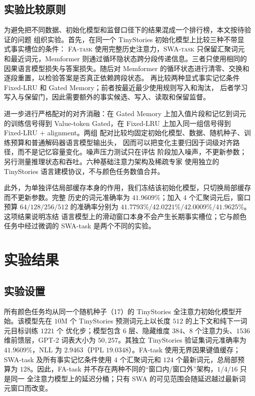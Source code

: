 \documentclass[letterpaper]{article}
\begin{document}
\subsection{实验比较原则}

为避免把不同数据、初始化模型和监督口径下的结果混成一个排行榜，本文按待验证的问题
组织实验。首先，在同一个 TinyStories 初始化模型上比较三种不带显式事实槽位的条件：
\textsc{FA-task} 使用完整历史注意力，\textsc{SWA-task} 只保留汇聚词元和最近词元，Memformer
则通过循环隐状态跨分段传递信息。三者只使用相同的因果语言模型损失与答案损失。随后对
Memformer 的循环状态进行清零、交换和逐段重置，以检验答案是否真正依赖跨段状态。
再比较两种显式事实记忆条件 Fixed-LRU 和 Gated Memory；前者按最近最少使用规则写入和淘汰，
后者学习写入与保留门，因此需要额外的事实候选、写入、读取和保留监督。

进一步进行严格配对的对齐消融：在 Gated Memory 上加入值片段和记忆到词元的训练信号得到
Value-token Gated，在 Fixed-LRU 上加入同一组信号得到 Fixed-LRU + alignment。两组
配对比较均固定初始化模型、数据、随机种子、训练预算和普通解码器语言模型输出头，
因而可以把变化主要归因于词级对齐路径，而不是记忆容量变化。噪声压力测试只在评估
阶段加入噪声，不更新参数；另行测量推理状态和吞吐。六种基础注意力架构及稀疏专家
使用独立的 TinyStories 语言建模协议，不与颜色任务数值合并。

此外，为单独评估局部缓存本身的作用，我们冻结该初始化模型，只切换局部缓存而不更新参数。完整
历史的词元准确率为 $41.9609\%$；加入 $4$ 个汇聚词元后，窗口预算 $64/128/256/512$
的准确率分别为 $41.7793\%/42.0221\%/42.0009\%/41.9625\%$。这项结果说明冻结
语言模型上的滑动窗口本身不会产生长期事实槽位；它与颜色任务中经过微调的
SWA-task 是两个不同的实验。

\section{实验结果}

\subsection{实验设置}

所有颜色任务均从同一个随机种子（17）的 TinyStories 全注意力初始化模型开始。该模型先在
$10$M 个 TinyStories 预测词元上以长度 $512$ 的上下文和纯下一词元目标训练 $1221$ 个
优化步；模型包含 $6$ 层、隐藏维度 $384$、$8$ 个注意力头、$1536$ 维前馈层，GPT-2
词表大小为 $50{,}257$。其独立 TinyStories 验证集词元准确率为 $41.9609\%$，NLL 为
$2.9463$（PPL $19.0348$）。FA-task 使用无界因果键值缓存；
SWA-task 及所有事实记忆条件使用 $4$ 个汇聚词元和 $124$ 个最新词元，总局部预算为
$128$。因此，FA-task 并不存在两种不同的“窗口内/窗口外”架构，$1/4/16$ 只是同一
全注意力模型上的延迟分桶；只有 SWA 的可见范围会随延迟越过最新词元窗口而改变。
\end{document}
